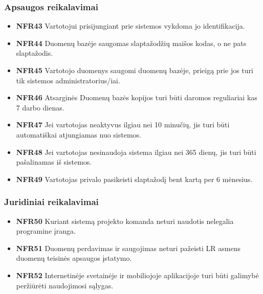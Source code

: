 \documentclass{VUMIFPSbakalaurinis}
\begin{document}
\subsubsection{Apsaugos reikalavimai}
\begin{itemize}
	\item \textbf{NFR43} Vartotojui prisijungiant prie sistemos vykdoma jo identifikacija.
	\item \textbf{NFR44} Duomenų bazėje saugomas slaptažodžių maišos kodas, o ne pats slaptažodis.
	\item \textbf{NFR45} Vartotojo duomenys saugomi duomenų bazėje, prieigą prie jos turi tik sistemos administratorius/iai.
	\item \textbf{NFR46} Atsarginės Duomenų bazės kopijos turi būti daromos reguliariai kas 7 darbo dienas.
	\item \textbf{NFR47} Jei vartotojas neaktyvus ilgiau nei 10 minučių, jis turi būti automatiškai atjungiamas nuo sistemos.
	\item \textbf{NFR48} Jei vartotojas nesinaudoja sistema ilgiau nei 365 dienų, jis turi būti pašalinamas iš sistemos.
	\item \textbf{NFR49} Vartotojas privalo pasikeisti slaptažodį bent kartą per 6 mėnesius.
\end{itemize}

\subsubsection{Juridiniai reikalavimai}
\begin{itemize}
	\item \textbf{NFR50} Kuriant sistemą projekto komanda neturi naudotis nelegalia programine įranga.
	\item \textbf{NFR51} Duomenų perdavimas ir saugojimas neturi pažeisti LR asmens duomenų teisinės apsaugos įstatymo.
	\item \textbf{NFR52} Internetinėje svetainėje ir mobiliojoje aplikacijoje turi būti galimybė peržiūrėti naudojimosi sąlygas.
\end{itemize}
\end{document}

